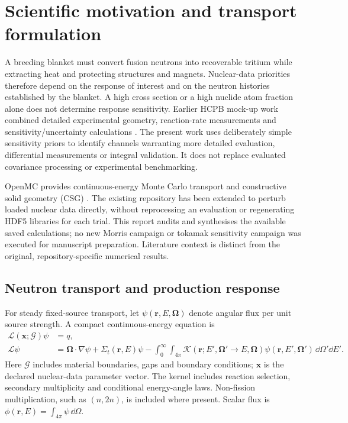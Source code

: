 \section{Scientific motivation and transport formulation}
\label{sec:physics}
A breeding blanket must convert fusion neutrons into recoverable tritium while extracting heat and protecting structures and magnets. Nuclear-data priorities therefore depend on the response of interest and on the neutron histories established by the blanket. A high cross section or a high nuclide atom fraction alone does not determine response sensitivity. Earlier HCPB mock-up work combined detailed experimental geometry, reaction-rate measurements and sensitivity/uncertainty calculations \citep{hcpbsensitivity}. The present work uses deliberately simple sensitivity priors to identify channels warranting more detailed evaluation, differential measurements or integral validation. It does not replace evaluated covariance processing or experimental benchmarking.

OpenMC provides continuous-energy Monte Carlo transport and constructive solid geometry (CSG) \citep{openmc}. The existing repository has been extended to perturb loaded nuclear data directly, without reprocessing an evaluation or regenerating HDF5 libraries for each trial. This report audits and synthesises the available saved calculations; no new Morris campaign or tokamak sensitivity campaign was executed for manuscript preparation. Literature context is distinct from the original, repository-specific numerical results.

\subsection{Neutron transport and production response}
For steady fixed-source transport, let $\psi(\bm r,E,\bm\Omega)$ denote angular flux per unit source strength. A compact continuous-energy equation is
\begin{align}
\mathcal L(\bm x;\mathcal G)\psi &= q,\label{eq:transport}\\
\mathcal L\psi &= \bm\Omega\cdot\nabla\psi+\Sigma_t(\bm r,E)\psi
-\int_0^\infty\!\int_{4\pi}\mathcal K(\bm r;E',\bm\Omega'\!\to E,\bm\Omega)\psi(\bm r,E',\bm\Omega')\,\dd\Omega'\dd E'.
\end{align}
Here $\mathcal G$ includes material boundaries, gaps and boundary conditions; $\bm x$ is the declared nuclear-data parameter vector. The kernel includes reaction selection, secondary multiplicity and conditional energy-angle laws. Non-fission multiplication, such as $(n,2n)$, is included where present. Scalar flux is $\phi(\bm r,E)=\int_{4\pi}\psi\,\dd\Omega$.

